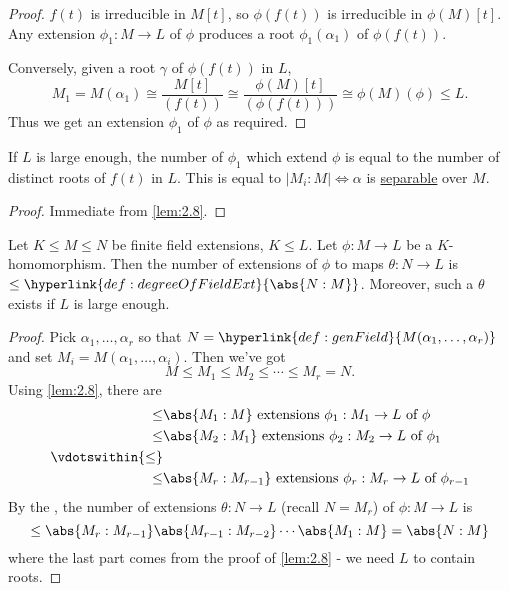 \documentclass{article}
\begin{document}
\begin{proof}
    $f(t)$ is irreducible in $M[t]$, so $\phi(f(t))$ is irreducible in $\phi(M)[t]$.
    Any extension $\phi_1: M \to L$ of $\phi$ produces a root $\phi_1(\alpha_1)$ of $\phi(f(t))$.

    Conversely, given a root $\gamma$ of $\phi(f(t))$ in $L$,
    \begin{equation*}
        M_1 = M(\alpha_1) \cong \frac{M[t]}{(f(t))} \cong \frac{\phi(M)[t]}{(\phi(f(t)))} \cong \phi(M)(\phi) \leq L.
    \end{equation*}
    Thus we get an extension $\phi_1$ of $\phi$ as required.
\end{proof}

\begin{ncor}\label{cor:2.9}
    If $L$ is large enough, the number of $\phi_1$ which extend $\phi$ is equal to the number of distinct roots of $f(t)$ in $L$.
    This is equal to $|M_i:M| \iff \alpha$ is \hyperlink{def:separableExt}{separable} over $M$.
\end{ncor}

\begin{proof}
    Immediate from \cref{lem:2.8}.
\end{proof}

\begin{ncor}\label{cor:2.10}
    Let $K \leq M \leq N$ be finite field extensions, $K \leq L$. Let $\phi: M \to L$ be a $K$-homomorphism.
    Then the number of extensions of $\phi$ to maps $\theta:N \to L$ is $\leq \hyperlink{def:degreeOfFieldExt}{\abs{N:M}}$.
    Moreover, such a $\theta$ exists if $L$ is large enough.
\end{ncor}

\begin{proof}
    Pick $\alpha_1, \dotsc, \alpha_r$ so that $N = \hyperlink{def:genField}{M(\alpha_1, \dotsc, \alpha_r)}$ and set $M_i = M(\alpha_1, \dotsc,\alpha_i)$. Then we've got
    \begin{equation*}
        M \leq M_1 \leq M_2 \leq \dotsb \leq M_r = N.
    \end{equation*}
    Using \cref{lem:2.8}, there are
    \begin{align*}
        \leq& \abs{M_1:M} \text{ extensions } \phi_1 : M_1 \to L \text{ of } \phi \\
        \leq& \abs{M_2:M_1} \text{ extensions } \phi_2 : M_2 \to L \text{ of } \phi_1 \\
        \vdotswithin{\leq}\\
        \leq& \abs{M_r:M_{r-1}} \text{ extensions } \phi_r : M_r \to L \text{ of } \phi_{r-1}
    \end{align*}
    By the , the number of extensions $\theta: N \to L$ (recall $N=M_r$) of $\phi:M \to L$ is
    \begin{equation*}
        \leq \abs{M_r:M_{r-1}} \abs{M_{r-1}:M_{r-2}} \cdots \abs{M_1:M} = \abs{N:M}
    \end{equation*}
    where the last part comes from the proof of \cref{lem:2.8} - we need $L$ to contain roots.
\end{proof}
\end{document}
